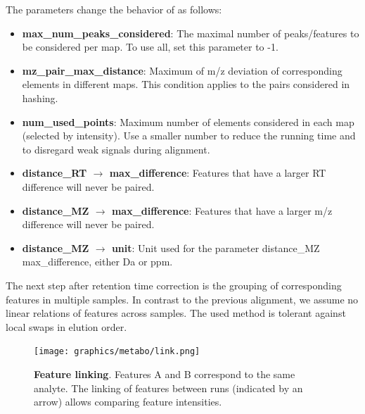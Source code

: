 \noindent The parameters change the behavior of  as follows:
\begin{itemize}
\item \textbf{max\_num\_peaks\_considered}: The maximal number of peaks/features to be considered per map. To use all, set this parameter to -1.
\item \textbf{mz\_pair\_max\_distance}: Maximum of m/z deviation of corresponding elements in different maps.  This condition applies to the pairs considered in hashing.
\item \textbf{num\_used\_points}: Maximum number of elements considered in each map (selected by intensity). Use a smaller number to reduce the running time and to disregard weak signals during alignment.
\item \textbf{distance\_RT $\rightarrow$ max\_difference}: Features that have a larger RT difference will never be paired.
\item \textbf{distance\_MZ $\rightarrow$ max\_difference}: Features that have a larger m/z difference will never be paired.
\item \textbf{distance\_MZ $\rightarrow$ unit}: Unit used for the parameter distance\_MZ max\_difference, either Da or ppm.
\end{itemize}

The next step after retention time correction is the grouping of corresponding features in multiple samples. In contrast to the previous alignment, we assume no linear relations of features across samples. The used method is tolerant against local swaps in elution order.

\begin{figure}[htb]
	\centering
	\texttt{[image: graphics/metabo/link.png]}
	\caption[Label-free quantification]
	{
	\textbf{Feature linking}. Features A and B correspond to the same analyte. The linking of features between runs (indicated by an arrow) allows comparing feature intensities.
	}
	\label{fig_bg_link}
\end{figure}

